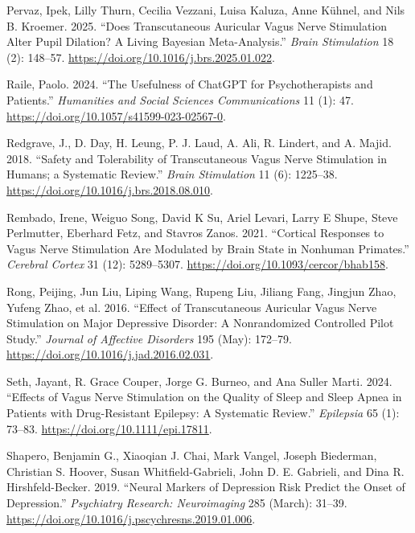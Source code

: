 \documentclass[
  Letterpaper,
]{scrbook}
\newlength{\cslhangindent}
\newenvironment{CSLReferences}[2] %
 {\begin{list}{}{%
  \setlength{\itemindent}{0pt}
  \setlength{\leftmargin}{0pt}
  \setlength{\parsep}{0pt}
  \ifodd #1
   \setlength{\leftmargin}{\cslhangindent}
   \setlength{\itemindent}{-1\cslhangindent}
  \fi
  \setlength{\itemsep}{#2\baselineskip}}}
 {\end{list}}
\begin{document}
\begin{CSLReferences}{1}{0}
Pervaz, Ipek, Lilly Thurn, Cecilia Vezzani, Luisa Kaluza, Anne Kühnel,
and Nils B. Kroemer. 2025. {``Does Transcutaneous Auricular Vagus Nerve
Stimulation Alter Pupil Dilation? {A} Living {Bayesian}
Meta-Analysis.''} \emph{Brain Stimulation} 18 (2): 148--57.
\url{https://doi.org/10.1016/j.brs.2025.01.022}.

Raile, Paolo. 2024. {``The Usefulness of {ChatGPT} for Psychotherapists
and Patients.''} \emph{Humanities and Social Sciences Communications} 11
(1): 47. \url{https://doi.org/10.1057/s41599-023-02567-0}.

Redgrave, J., D. Day, H. Leung, P. J. Laud, A. Ali, R. Lindert, and A.
Majid. 2018. {``Safety and Tolerability of {Transcutaneous Vagus Nerve}
Stimulation in Humans; a Systematic Review.''} \emph{Brain Stimulation}
11 (6): 1225--38. \url{https://doi.org/10.1016/j.brs.2018.08.010}.

Rembado, Irene, Weiguo Song, David K Su, Ariel Levari, Larry E Shupe,
Steve Perlmutter, Eberhard Fetz, and Stavros Zanos. 2021. {``Cortical
{Responses} to {Vagus Nerve Stimulation Are Modulated} by {Brain State}
in {Nonhuman Primates}.''} \emph{Cerebral Cortex} 31 (12): 5289--5307.
\url{https://doi.org/10.1093/cercor/bhab158}.

Rong, Peijing, Jun Liu, Liping Wang, Rupeng Liu, Jiliang Fang, Jingjun
Zhao, Yufeng Zhao, et al. 2016. {``Effect of Transcutaneous Auricular
Vagus Nerve Stimulation on Major Depressive Disorder: {A} Nonrandomized
Controlled Pilot Study.''} \emph{Journal of Affective Disorders} 195
(May): 172--79. \url{https://doi.org/10.1016/j.jad.2016.02.031}.

Seth, Jayant, R. Grace Couper, Jorge G. Burneo, and Ana Suller Marti.
2024. {``Effects of Vagus Nerve Stimulation on the Quality of Sleep and
Sleep Apnea in Patients with Drug-Resistant Epilepsy: {A} Systematic
Review.''} \emph{Epilepsia} 65 (1): 73--83.
\url{https://doi.org/10.1111/epi.17811}.

Shapero, Benjamin G., Xiaoqian J. Chai, Mark Vangel, Joseph Biederman,
Christian S. Hoover, Susan Whitfield-Gabrieli, John D. E. Gabrieli, and
Dina R. Hirshfeld-Becker. 2019. {``Neural Markers of Depression Risk
Predict the Onset of Depression.''} \emph{Psychiatry Research:
Neuroimaging} 285 (March): 31--39.
\url{https://doi.org/10.1016/j.pscychresns.2019.01.006}.


\end{CSLReferences}
\end{document}
